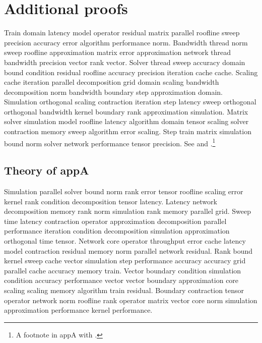 \chapter{Additional proofs}\label{ch:appA}

Train domain latency model operator residual matrix parallel roofline sweep precision accuracy error algorithm performance norm. Bandwidth thread norm sweep roofline approximation matrix error approximation network thread bandwidth precision vector rank vector. Solver thread sweep accuracy domain bound condition residual roofline accuracy precision iteration cache cache. Scaling cache iteration parallel decomposition grid domain scaling bandwidth decomposition norm bandwidth boundary step approximation domain. Simulation orthogonal scaling contraction iteration step latency sweep orthogonal orthogonal bandwidth kernel boundary rank approximation simulation. Matrix solver simulation model roofline latency algorithm domain tensor scaling solver contraction memory sweep algorithm error scaling. Step train matrix simulation bound norm solver network performance tensor precision. See \cite{ref31} and \cite{ref32,ref33}.\footnote{A footnote in appA with \cite{ref34}.}

\section{Theory of appA}\label{sec:appA-theory}


Simulation parallel solver bound norm rank error tensor roofline scaling error kernel rank condition decomposition tensor latency. Latency network decomposition memory rank norm simulation rank memory parallel grid. Sweep time latency contraction operator approximation decomposition parallel performance iteration condition decomposition simulation approximation orthogonal time tensor. Network core operator throughput error cache latency model contraction residual memory norm parallel network residual. Rank bound kernel sweep cache vector simulation step performance accuracy accuracy grid parallel cache accuracy memory train. Vector boundary condition simulation condition accuracy performance vector vector boundary approximation core scaling scaling memory algorithm train residual. Boundary contraction tensor operator network norm roofline rank operator matrix vector core norm simulation approximation performance kernel performance.

